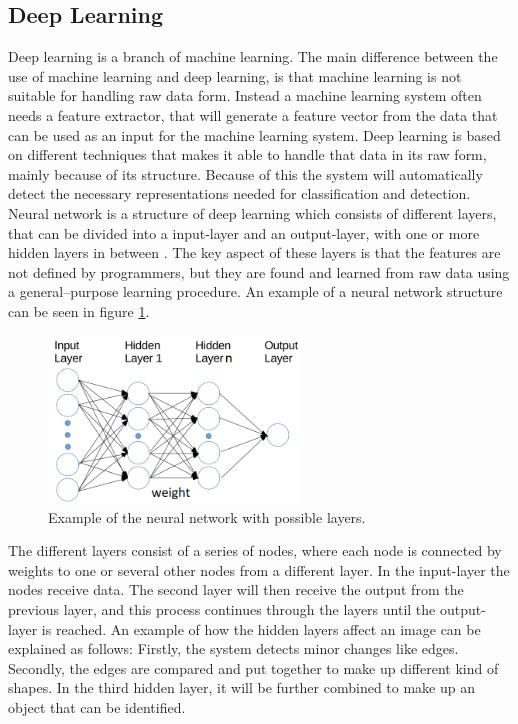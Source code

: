 \subsection{Deep Learning}
Deep learning is a branch of machine learning. The main difference between the use of machine learning and deep learning, is that machine learning is not suitable for handling raw data form. Instead a machine learning system often needs a feature extractor, that will generate a feature vector from the data that can be used as an input for the machine learning system.
Deep learning is based on different techniques that makes it able to handle that data in its raw form, mainly because of its structure.\citep{LeCun2015, Schmidhuber2015} Because of this the system will automatically detect the necessary representations needed for classification and detection. Neural network is a structure of deep learning which consists of different layers, that can be divided into a input-layer and an output-layer, with one or more hidden layers in between \citep{Schmidhuber2015}. The key aspect of these layers is that the features are not defined by programmers, but they are found and learned from raw data using a general–purpose learning procedure.\citep{LeCun2015} An example of a neural network structure can be seen in figure \ref{fig:NN_structure}.   

\begin{figure} [H]
\centering
\includegraphics[width=0.6\textwidth]{figures/NN_structure}
\caption{Example of the neural network with possible layers\citep{Acquarelli2017}.}
\label{fig:NN_structure}  
\end{figure}

\noindent
The different layers consist of a series of nodes, where each node is connected by weights to one or several other nodes from a different layer. In the input-layer the nodes receive data. The second layer will then receive the output from the previous layer, and this process continues through the layers until the output-layer is reached.\citep{Schmidhuber2015} An example of how the hidden layers affect an image can be explained as follows:  
Firstly, the system detects minor changes like edges. Secondly, the edges are compared and put together to make up different kind of shapes. In the third hidden layer, it will be further combined to make up an object that can be identified.\citep{LeCun2015}


